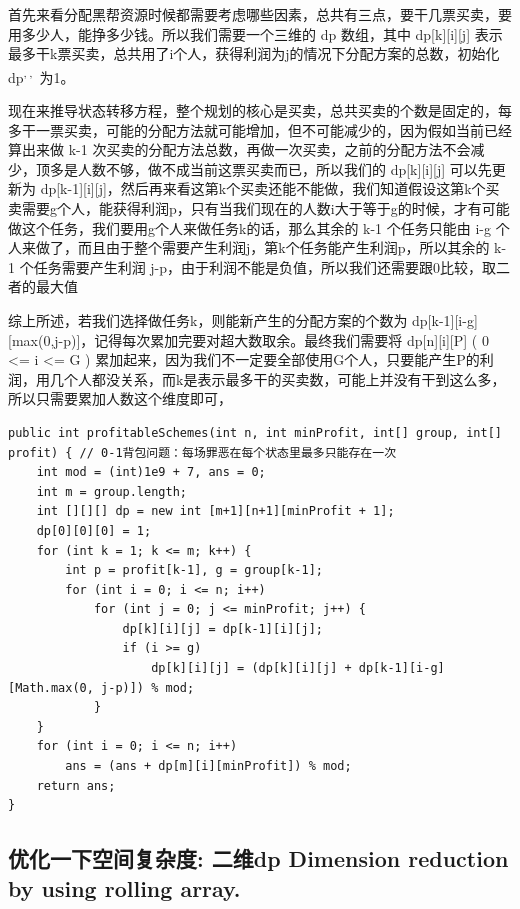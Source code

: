 \documentclass[9pt, b5paaper]{book}
\begin{document}
首先来看分配黑帮资源时候都需要考虑哪些因素，总共有三点，要干几票买卖，要用多少人，能挣多少钱。所以我们需要一个三维的 dp 数组，其中 dp[k][i][j] 表示最多干k票买卖，总共用了i个人，获得利润为j的情况下分配方案的总数，初始化 dp\footnotemark[2]{}\textsuperscript{,}\,\footnotemark[2]{}\textsuperscript{,}\,\footnotemark[2]{} 为1。

现在来推导状态转移方程，整个规划的核心是买卖，总共买卖的个数是固定的，每多干一票买卖，可能的分配方法就可能增加，但不可能减少的，因为假如当前已经算出来做 k-1 次买卖的分配方法总数，再做一次买卖，之前的分配方法不会减少，顶多是人数不够，做不成当前这票买卖而已，所以我们的 dp[k][i][j] 可以先更新为 dp[k-1][i][j]，然后再来看这第k个买卖还能不能做，我们知道假设这第k个买卖需要g个人，能获得利润p，只有当我们现在的人数i大于等于g的时候，才有可能做这个任务，我们要用g个人来做任务k的话，那么其余的 k-1 个任务只能由 i-g 个人来做了，而且由于整个需要产生利润j，第k个任务能产生利润p，所以其余的 k-1 个任务需要产生利润 j-p，由于利润不能是负值，所以我们还需要跟0比较，取二者的最大值

综上所述，若我们选择做任务k，则能新产生的分配方案的个数为 dp[k-1][i-g][max(0,j-p)]，记得每次累加完要对超大数取余。最终我们需要将 dp[n][i][P] ( 0 <= i <= G ) 累加起来，因为我们不一定要全部使用G个人，只要能产生P的利润，用几个人都没关系，而k是表示最多干的买卖数，可能上并没有干到这么多，所以只需要累加人数这个维度即可，

\begin{verbatim}
public int profitableSchemes(int n, int minProfit, int[] group, int[] profit) { // 0-1背包问题：每场罪恶在每个状态里最多只能存在一次
    int mod = (int)1e9 + 7, ans = 0;
    int m = group.length;
    int [][][] dp = new int [m+1][n+1][minProfit + 1]; 
    dp[0][0][0] = 1;
    for (int k = 1; k <= m; k++) {
        int p = profit[k-1], g = group[k-1];
        for (int i = 0; i <= n; i++) 
            for (int j = 0; j <= minProfit; j++) {
                dp[k][i][j] = dp[k-1][i][j];
                if (i >= g)
                    dp[k][i][j] = (dp[k][i][j] + dp[k-1][i-g][Math.max(0, j-p)]) % mod;
            }
    }
    for (int i = 0; i <= n; i++) 
        ans = (ans + dp[m][i][minProfit]) % mod;
    return ans;
}
\end{verbatim}
\subsection{优化一下空间复杂度: 二维dp Dimension reduction by using rolling array.}
\label{sec-1-26-2}
\end{document}
